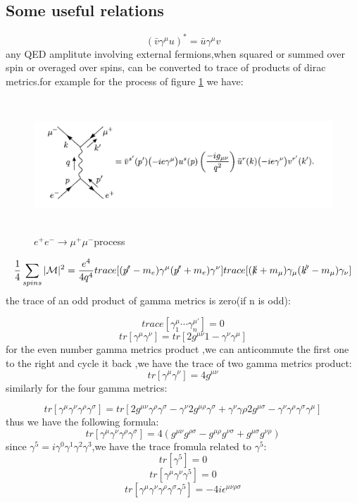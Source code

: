 \subsection{Some useful relations}
\[(\bar{v}\gamma^\mu u)^*=\bar{u}\gamma^{\mu} v\]
any QED amplitute involving external fermions,when squared or summed over spin or overaged over spins, can be converted to trace of products of dirac metrics.for example for the process of figure \ref{fig:qedee} we have:\par
\begin{figure}
\begin{center}
\includegraphics[height=5cm]{./figures/QEDee.PNG}
\caption{$e^+e^-\rightarrow \mu^+\mu^-$process}
\label{fig:qedee}
\end{center}
\end{figure}
\[\frac{1}{4}\sum_{spins}|\mathcal{M}|^2=\frac{e^4}{4q^4}trace[(\slashed{p'}-m_e)\gamma^\mu(\slashed{p'}+m_e)\gamma^\nu]trace[(\slashed{k}+m_\mu)\gamma_\mu(\slashed{k'}-m_\mu)\gamma_\nu]\]
the trace of an odd product of gamma metrics is zero(if n is odd):\par
\[trace[\gamma_1^{\mu}\cdots\gamma^{\mu'}_n]=0\]
\[tr[\gamma^\mu\gamma^\nu]=tr[2g^{\mu\nu}1-\gamma^\nu\gamma^\mu]\]
for the even number gamma metrics product ,we can anticommute the first one to the right and cycle it back ,we have the trace of two gamma metrics product:
\[tr[\gamma^\mu\gamma^\nu]=4g^{\mu\nu}\]
similarly for the four gamma metrics:\par
\[tr[\gamma^\mu\gamma^\nu\gamma^\rho\gamma^\sigma]=tr[2g^{\mu\nu}\gamma^\rho\gamma^\sigma-\gamma^\nu 2g^{\mu\rho}\gamma^\sigma+\gamma^\nu\gamma\rho 2g^{\mu\sigma}-\gamma^\nu\gamma^\rho\gamma^\sigma\gamma^\mu]\]
thus we have the following formula:
\[tr[\gamma^\mu\gamma^\nu\gamma^\rho\gamma^\sigma]=4(g^{\mu\nu}g^{\rho\sigma}-g^{\mu\rho}g^{\nu\sigma}+g^{\mu\sigma}g^{\nu\rho})\]
since $\gamma^5=i\gamma^0\gamma^1\gamma^2\gamma^3$,we have the trace fromula related to $\gamma^5$:
\[tr[\gamma^5]=0\]
\[tr[\gamma^\mu\gamma^\nu\gamma^5]=0\]
\[tr[\gamma^\mu\gamma^\nu\gamma^\rho\gamma^\sigma\gamma^5]=-4i\epsilon^{\mu\nu\rho\sigma}\]
